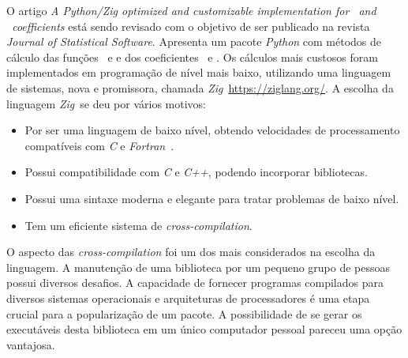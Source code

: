 O artigo \emph{A Python/Zig optimized and customizable
implementation for \pdcca~and \dmc~coefficients} está sendo revisado com o objetivo de ser publicado na revista \emph{Journal of Statistical Software}. Apresenta um pacote \emph{Python} com métodos de cálculo das funções \dfa~e \dcca e dos coeficientes \pdcca~e \dmc. Os cálculos mais custosos foram implementados em programação de nível mais baixo, utilizando uma linguagem de sistemas, nova e promissora, chamada \emph{Zig}~\url{https://ziglang.org/}. A escolha da linguagem \emph{Zig}~se deu por vários motivos: 

\begin{itemize}
\item Por ser uma linguagem de baixo nível, obtendo velocidades de processamento compatíveis com \emph{C} e \emph{Fortran}~\cite{10820804, Kacs_2024}.
\item Possui compatibilidade com \emph{C} e \emph{C++}, podendo incorporar bibliotecas.
\item Possui uma sintaxe moderna e elegante para tratar problemas de baixo nível.
\item Tem um eficiente sistema de \emph{cross-compilation}.
\end{itemize}

O aspecto das \emph{cross-compilation} foi um dos mais considerados na escolha da linguagem. A manutenção de uma biblioteca por um pequeno grupo de pessoas possui diversos desafios. A capacidade de fornecer programas compilados para diversos sistemas operacionais e arquiteturas de processadores é uma etapa crucial para a popularização de um pacote. A possibilidade de se gerar os executáveis desta biblioteca em um único computador pessoal pareceu uma opção vantajosa.

